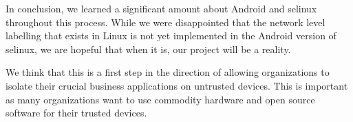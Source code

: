In conclusion, we learned a significant amount about Android and \ac{selinux} throughout this process.
While we were disappointed that the network level labelling that exists in Linux is not yet implemented in the Android version of \ac{selinux}, we are hopeful that when it is, our project will be a reality.

We think that this is a first step in the direction of allowing organizations to isolate their crucial business applications on untrusted devices.
This is important as many organizations want to use commodity hardware and open source software for their trusted devices.
